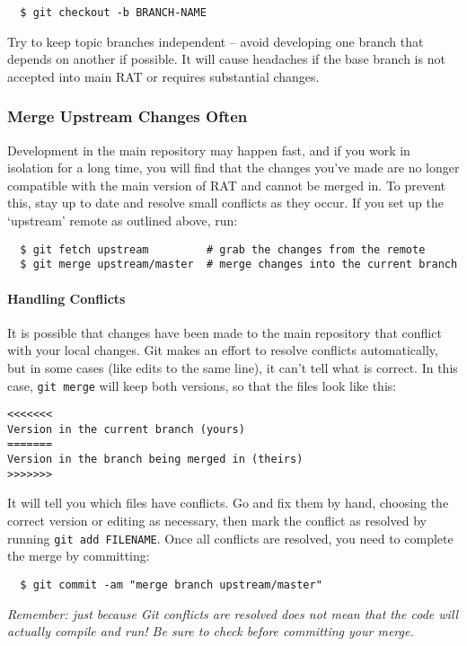 \documentclass{article}
\begin{document}
\begin{verbatim}
  $ git checkout -b BRANCH-NAME
\end{verbatim}
Try to keep topic branches independent -- avoid developing one branch that
depends on another if possible. It will cause headaches if the base branch is
not accepted into main RAT or requires substantial changes.

\subsubsection{Merge Upstream Changes Often}
\label{sec:merge-upstream}
Development in the main repository may happen
fast, and if you work in isolation for a long time, you will find that
the changes you've made are no longer compatible with the main version of RAT
and cannot be merged in. To prevent this, stay up to date and resolve small
conflicts as they occur. If you set up the
`upstream' remote as outlined above, run:

\begin{verbatim}
  $ git fetch upstream         # grab the changes from the remote
  $ git merge upstream/master  # merge changes into the current branch
\end{verbatim}

\paragraph{Handling Conflicts} 
It is possible that changes have been made to the main repository that
conflict with your local changes. Git makes an effort to resolve conflicts
automatically, but in some cases (like edits to the same line), it can't
tell what is correct. In this case, {\tt git merge} will keep both versions,
so that the files look like this:

\begin{verbatim}
<<<<<<<
Version in the current branch (yours)
=======
Version in the branch being merged in (theirs)
>>>>>>>
\end{verbatim}
It will tell you which files have conflicts. Go and fix them by hand, choosing
the correct version or editing as necessary, then mark the conflict as
resolved by running {\tt git add FILENAME}. Once all conflicts are resolved,
you need to complete the merge by committing:

\begin{verbatim}
  $ git commit -am "merge branch upstream/master"
\end{verbatim}
{\it Remember: just because Git conflicts are resolved does not mean that the
code will actually compile and run! Be sure to check before
committing your merge.}\\
\end{document}
